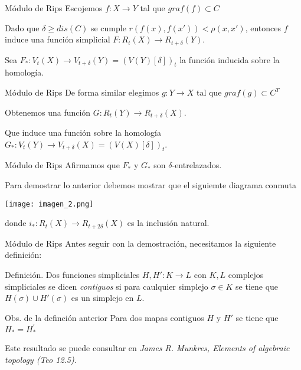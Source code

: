 \documentclass{beamer}
\begin{document}
\begin{frame}{Módulo de Rips}
    Escojemos $f: X \to Y$ tal que $graf(f)\subset C$
    \newline
    \pause
    
    Dado que $\delta \geq dis(C)$  se cumple $r(f(x), f(x')) < \rho(x, x')$, entonces $f$ induce una función simplicial $F: R_{t}(X) \to R_{t+\delta}(Y)$.
    \newline
    \pause
    
    Sea $F_{*}: V_{t}(X) \to V_{t+\delta}(Y)= (V(Y)[\delta])_{t}$ la función inducida sobre la homología. 
\end{frame}

\begin{frame}{Módulo de Rips}
    De forma similar elegimos $g: Y \to X$ tal que $graf(g)\subset C^{T}$
    \newline
    \pause
    
    Obtenemos una función $G: R_{t}(Y) \to R_{t+\delta}(X)$.
    \newline
    \pause
    
    Que induce una función sobre la homología $G_{*}: V_{t}(Y) \to V_{t+\delta}(X)= (V(X)[\delta])_{t}$. 
\end{frame}

\begin{frame}{Módulo de Rips}
    Afirmamos que $F_{*}$ y $G_{*}$ son $\delta$-entrelazados.
    \newline

    Para demostrar lo anterior debemos mostrar que el siguiemte diagrama conmuta

     \texttt{[image: imagen\_2.png]}
     
    donde $i_{*}:R_{t}(X) \to R_{t+2\delta}(X)$ es la inclusión natural.
\end{frame}

\begin{frame}{Módulo de Rips}
    Antes seguir con la demostración, necesitamos la siguiente definición:   
    \newline 
    
    \begin{block}{Definición.}
        Dos funciones simpliciales $H,H':K\to L$ con $K, L$ complejos simpliciales se dicen \textit{contiguos} si para caulquier simplejo $\sigma \in K$ se tiene que $H(\sigma) \cup H'(\sigma)$ es un simplejo en $L$.  
    \end{block}
    \pause 

    \begin{block}{Obs. de la definción anterior}
        Para dos mapas contiguos $H$ y $H'$ se tiene    que $H_{*} = H^{'}_{*}$ 
        
        Este resultado se puede consultar en \textit{James R. Munkres, Elements of algebraic topology (Teo 12.5).}
    \end{block}
\end{frame}
\end{document}
